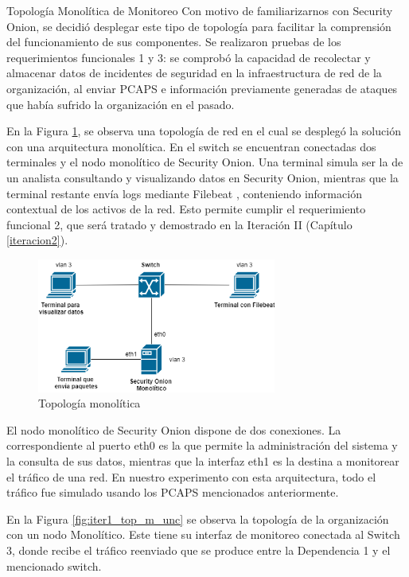    \begin{subsection}{Topología Monolítica de Monitoreo}
    Con motivo de familiarizarnos con Security Onion, se decidió desplegar este tipo de topología para facilitar la comprensión del funcionamiento de sus componentes. Se realizaron pruebas de los requerimientos funcionales 1 y 3: se comprobó la capacidad de recolectar y almacenar datos de incidentes de seguridad en la infraestructura de red de la organización, al enviar PCAPS e información previamente generadas de ataques que había sufrido la organización en el pasado. \par
    En la Figura \ref{fig:figura_33_a}, se observa una topología de red en el cual se desplegó la solución con una arquitectura monolítica. En el switch se encuentran conectadas dos terminales y el nodo monolítico de Security Onion. Una terminal simula ser la de un analista consultando y visualizando datos en Security Onion, mientras que la terminal restante envía logs mediante Filebeat \cite{filebeat}, conteniendo información contextual de los activos de la red. Esto permite cumplir el requerimiento funcional 2, que será tratado y demostrado en la Iteración II (Capítulo \ref{iteracion2}).
    \begin{figure}[H]
    \centering
    \includegraphics[width=0.7\textwidth]{./iteracion_1_imagenes/figura_33_a_topologia_de_prueba_1.png}
    \caption{Topología monolítica}
    \label{fig:figura_33_a}
    \end{figure}
    El nodo monolítico de Security Onion dispone de dos conexiones. La correspondiente al puerto eth0 es la que permite la administración del sistema y la consulta de sus datos, mientras que la interfaz eth1 es la destina a monitorear el tráfico de una red. En nuestro experimento con esta arquitectura, todo el tráfico fue simulado usando los PCAPS mencionados anteriormente. \par
    En la Figura \ref{fig:iter1_top_m_unc} se observa la topología de la organización con un nodo Monolítico. Este tiene su interfaz de monitoreo conectada al Switch 3, donde recibe el tráfico reenviado que se produce entre la Dependencia 1 y el mencionado switch.

\end{subsection}
